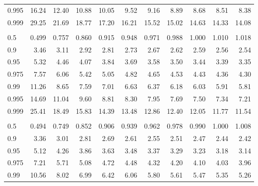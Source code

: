 \documentclass[]{article}
\begin{document}
\begin{table}[H]
\begin{tabular}{lrrrrrrrrrr}
\hspace{1em}0.995 & 16.24 & 12.40 & 10.88 & 10.05 & 9.52 & 9.16 & 8.89 & 8.68 & 8.51 & 8.38\\
\hspace{1em}0.999 & 29.25 & 21.69 & 18.77 & 17.20 & 16.21 & 15.52 & 15.02 & 14.63 & 14.33 & 14.08\\
\addlinespace[0.3em]
\multicolumn{11}{l}{\textbf{$k_2=8$}}\\
\hspace{1em}0.5 & 0.499 & 0.757 & 0.860 & 0.915 & 0.948 & 0.971 & 0.988 & 1.000 & 1.010 & 1.018\\
\hspace{1em}0.9 & 3.46 & 3.11 & 2.92 & 2.81 & 2.73 & 2.67 & 2.62 & 2.59 & 2.56 & 2.54\\
\hspace{1em}0.95 & 5.32 & 4.46 & 4.07 & 3.84 & 3.69 & 3.58 & 3.50 & 3.44 & 3.39 & 3.35\\
\hspace{1em}0.975 & 7.57 & 6.06 & 5.42 & 5.05 & 4.82 & 4.65 & 4.53 & 4.43 & 4.36 & 4.30\\
\hspace{1em}0.99 & 11.26 & 8.65 & 7.59 & 7.01 & 6.63 & 6.37 & 6.18 & 6.03 & 5.91 & 5.81\\
\hspace{1em}0.995 & 14.69 & 11.04 & 9.60 & 8.81 & 8.30 & 7.95 & 7.69 & 7.50 & 7.34 & 7.21\\
\hspace{1em}0.999 & 25.41 & 18.49 & 15.83 & 14.39 & 13.48 & 12.86 & 12.40 & 12.05 & 11.77 & 11.54\\
\addlinespace[0.3em]
\multicolumn{11}{l}{\textbf{$k_2=9$}}\\
\hspace{1em}0.5 & 0.494 & 0.749 & 0.852 & 0.906 & 0.939 & 0.962 & 0.978 & 0.990 & 1.000 & 1.008\\
\hspace{1em}0.9 & 3.36 & 3.01 & 2.81 & 2.69 & 2.61 & 2.55 & 2.51 & 2.47 & 2.44 & 2.42\\
\hspace{1em}0.95 & 5.12 & 4.26 & 3.86 & 3.63 & 3.48 & 3.37 & 3.29 & 3.23 & 3.18 & 3.14\\
\hspace{1em}0.975 & 7.21 & 5.71 & 5.08 & 4.72 & 4.48 & 4.32 & 4.20 & 4.10 & 4.03 & 3.96\\
\hspace{1em}0.99 & 10.56 & 8.02 & 6.99 & 6.42 & 6.06 & 5.80 & 5.61 & 5.47 & 5.35 & 5.26\\

\end{tabular}
\end{table}
\end{document}
